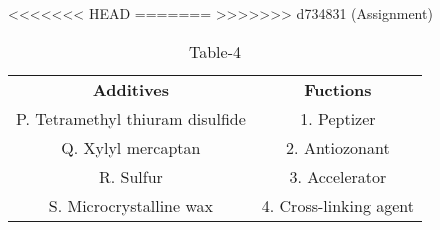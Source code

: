 \begin{table}[htbp]
  \centering
  \caption{Table-4}
<<<<<<< HEAD
  \label{tab:tables/table4.tex}
=======
  \label{table4}
>>>>>>> d734831 (Assignment)
  \begin{tabular}{cc}
\textbf{Additives} & \textbf{Fuctions} \\

P. Tetramethyl thiuram disulfide & 1. Peptizer \\
Q. Xylyl mercaptan & 2. Antiozonant\\
R. Sulfur & 3. Accelerator \\
S. Microcrystalline wax & 4. Cross-linking agent \\
  
  
  
  \end{tabular}
\end{table}







